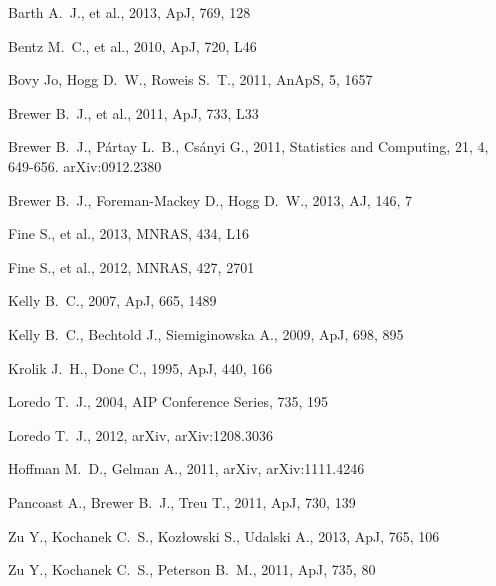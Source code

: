 \documentclass[useAMS,usenatbib]{mn2e}
\begin{document}
\begin{thebibliography}{99}
Barth A.~J., et al., 2013, ApJ, 769, 128 

Bentz M.~C., et al., 2010, ApJ, 720, L46 

 Bovy Jo, Hogg D.~W., Roweis S.~T., 2011, AnApS, 5, 1657 

Brewer B.~J., et al., 2011, ApJ, 733, L33 

 Brewer B.~J., P{\'a}rtay L.~B.,
Cs{\'a}nyi G., 2011, Statistics and Computing, 21, 4, 649-656. arXiv:0912.2380

 Brewer B.~J., Foreman-Mackey D., Hogg D.~W., 2013, AJ, 146, 7 

Fine S., et al., 2013, MNRAS, 434, L16 

Fine S., et al., 2012, MNRAS, 427, 2701 

 Kelly 
B.~C., 2007, ApJ, 665, 1489 

 Kelly B.~C., Bechtold J.,
Siemiginowska A., 2009, ApJ, 698, 895 

 Krolik J.~H., Done C., 1995, ApJ, 440, 166 

 Loredo 
T.~J., 2004, AIP Conference Series, 735, 195 

 Loredo 
T.~J., 2012, arXiv, arXiv:1208.3036 

 Hoffman M.~D., Gelman A., 2011, arXiv, arXiv:1111.4246 

 Pancoast A., Brewer B.~J., Treu T., 2011, ApJ, 730, 139 

 Zu 
Y., Kochanek C.~S., Koz{\l}owski S., Udalski A., 2013, ApJ, 765, 106 

 Zu Y., Kochanek C.~S., Peterson B.~M., 2011, ApJ, 735, 80 



\end{thebibliography}
\end{document}
